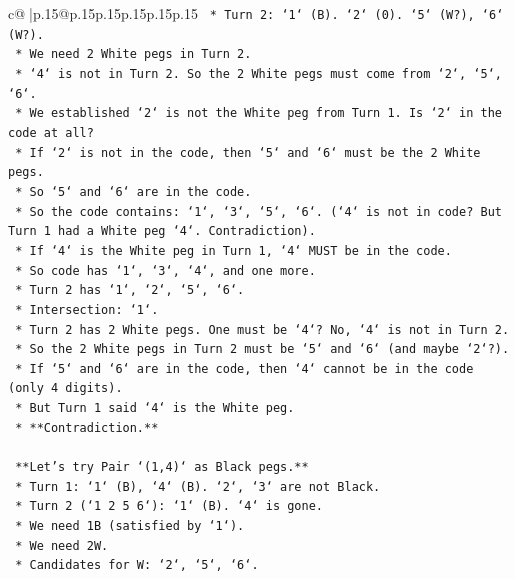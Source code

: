 \documentclass{article}
\begin{document}
{\begin{supertabular}{c@{$\;$}|p{.15\linewidth}@{}p{.15\linewidth}p{.15\linewidth}p{.15\linewidth}p{.15\linewidth}p{.15\linewidth}}
{{{\texttt{                *   Turn 2: `1` (B). `2` (0). `5` (W?), `6` (W?).} \\
\texttt{                *   We need 2 White pegs in Turn 2.} \\
\texttt{                *   `4` is not in Turn 2. So the 2 White pegs must come from `2`, `5`, `6`.} \\
\texttt{                *   We established `2` is not the White peg from Turn 1. Is `2` in the code at all?} \\
\texttt{                *   If `2` is not in the code, then `5` and `6` must be the 2 White pegs.} \\
\texttt{                *   So `5` and `6` are in the code.} \\
\texttt{                *   So the code contains: `1`, `3`, `5`, `6`. (`4` is not in code? But Turn 1 had a White peg `4`. Contradiction).} \\
\texttt{                *   If `4` is the White peg in Turn 1, `4` MUST be in the code.} \\
\texttt{                *   So code has `1`, `3`, `4`, and one more.} \\
\texttt{                *   Turn 2 has `1`, `2`, `5`, `6`.} \\
\texttt{                *   Intersection: `1`.} \\
\texttt{                *   Turn 2 has 2 White pegs. One must be `4`? No, `4` is not in Turn 2.} \\
\texttt{                *   So the 2 White pegs in Turn 2 must be `5` and `6` (and maybe `2`?).} \\
\texttt{                *   If `5` and `6` are in the code, then `4` cannot be in the code (only 4 digits).} \\
\texttt{                *   But Turn 1 said `4` is the White peg.} \\
\texttt{                *   **Contradiction.**} \\
\\ 
\texttt{    **Let's try Pair `(1,4)` as Black pegs.**} \\
\texttt{    *   Turn 1: `1` (B), `4` (B). `2`, `3` are not Black.} \\
\texttt{    *   Turn 2 (`1 2 5 6`): `1` (B). `4` is gone.} \\
\texttt{    *   We need 1B (satisfied by `1`).} \\
\texttt{    *   We need 2W.} \\
\texttt{    *   Candidates for W: `2`, `5`, `6`.} \\
}}}
\end{supertabular}}
\end{document}
